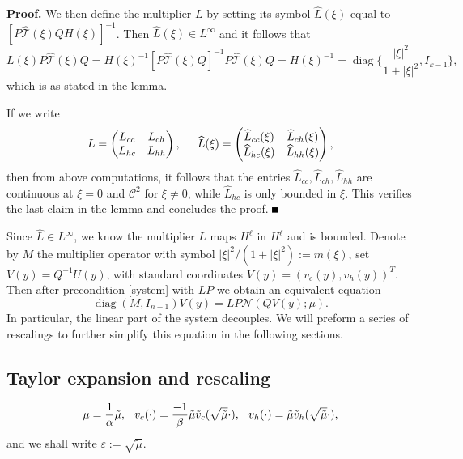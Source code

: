 \documentclass[10pt]{article}
\newenvironment{Proof}%
 {\begin{trivlist} \item[]{\bf Proof. }}%
 {\hspace*{\fill}$\rule{.4\baselineskip}{.4\baselineskip}$\end{trivlist}}
\newcommand{\eps}{\varepsilon}
\newcommand{\Nl}{\mathcal{N}}
\newcommand{\That}{\widehat{\mathcal{T}}}
\newcommand{\diag}{\operatorname{diag}}
\begin{document}
\begin{Proof}
 We then define the multiplier $L$ by setting its symbol $\widehat{L}(\xi)$ equal to $[P\That(\xi)QH(\xi)]^{-1}$. Then $\widehat{L} (\xi) \in L^\infty$ and it follows that
 \[
 L(\xi)P\That(\xi)Q = H(\xi)^{-1}[P\That(\xi)Q]^{-1}P\That(\xi)Q = H(\xi)^{-1}=\diag\{\dfrac{|\xi|^2}{1+|\xi|^2},I_{k-1}\},
 \]
 which is as stated in the lemma. 
 
 If we write
\[
L  = \begin{pmatrix}
L_{cc} & L_{ch} \\
L_{hc} & L_{hh} 
\end{pmatrix}, \hspace{0.2in}
\widehat{L}(\xi)  = \begin{pmatrix}
\widehat{L}_{cc}(\xi) & \widehat{L}_{ch}(\xi) \\
\widehat{L}_{hc}(\xi) & \widehat{L}_{hh}(\xi) 
\end{pmatrix},
\]
then from above computations, it follows that the entries $\widehat{L}_{cc}, \widehat{L}_{ch},\widehat{L}_{hh}$ are continuous at $\xi = 0$ and $\mathscr{C}^2$ for $\xi \neq 0$, while $\widehat{L}_{hc}$ is only bounded in $\xi$. This verifies the last claim in the lemma and concludes the proof. 
 \end{Proof}
 
 
 Since $\widehat{L} \in L^\infty$, we know the multiplier $L$ maps $H^\ell$ in $H^\ell$ and is bounded. Denote by $M$ the multiplier operator with symbol $|\xi|^2/(1+|\xi|^2):= m(\xi)$, set $V(y)=Q^{-1}U(y)$, with standard coordinates $V(y)=(v_c(y),v_h(y))^T$. Then after precondition \eqref{system} with $LP$ we obtain an equivalent equation
\begin{equation}\label{TranEq}
\diag(M, I_{n-1})V(y)=LP\Nl(QV(y);\mu).
\end{equation}
In particular, the linear part of the system decouples. We will preform a series of rescalings to further simplify this equation in the following sections.



\subsection{Taylor expansion and rescaling}
\iffalse
\[
\mu=\frac{1}{\alpha}\tilde{\mu}, \hspace{0.1in} v_c(\cdot)=\frac{-1}{\beta}\tilde{\mu}\tilde{v}_c(\sqrt{\tilde{\mu}} \cdot), \hspace{0.1in} v_h(\cdot)=\tilde{\mu} \tilde{v}_h(\sqrt{\tilde{\mu}} \cdot),
\] and we shall write $\eps := \sqrt{\tilde{\mu}}$.
\end{document}
